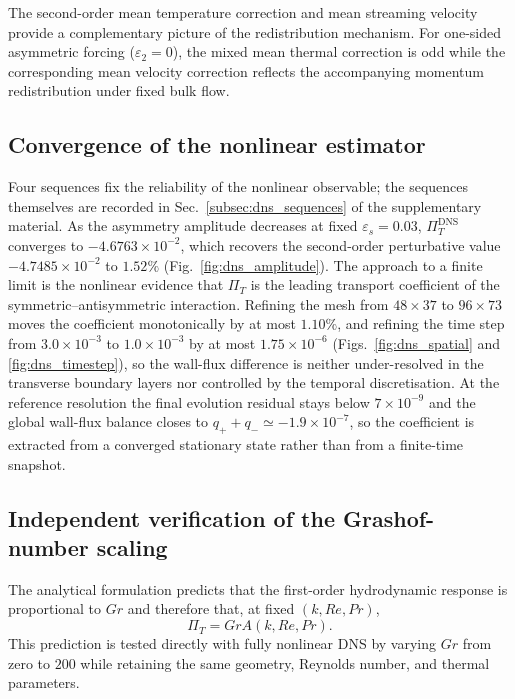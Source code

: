 \documentclass[12pt,a4paper]{article}
\newcommand{\Rey}{\mathit{Re}}
\newcommand{\Grr}{\mathit{Gr}}
\renewcommand{\Pr}{\mathit{Pr}}
\newcommand{\PiT}{\Pi_T}
\begin{document}
The second-order mean temperature correction and mean streaming velocity provide a complementary picture
of the redistribution mechanism. For one-sided asymmetric forcing ($\varepsilon_2=0$), the mixed mean
thermal correction is odd while the corresponding mean velocity correction reflects the accompanying momentum
redistribution under fixed bulk flow.

\subsection{Convergence of the nonlinear estimator}
\label{subsec:dns_amplitude}
\label{subsec:dns_convergence}

Four sequences fix the reliability of the nonlinear observable; the sequences
themselves are recorded in Sec.~\ref{subsec:dns_sequences} of the supplementary material. As the
asymmetry amplitude decreases at fixed $\varepsilon_s=0.03$,
$\PiT^{\mathrm{DNS}}$ converges to $-4.6763\times10^{-2}$, which recovers the
second-order perturbative value $-4.7485\times10^{-2}$ to $1.52\%$
(Fig.~\ref{fig:dns_amplitude}). The approach to a finite limit is the nonlinear evidence that $\PiT$ is the leading transport coefficient of the symmetric--antisymmetric interaction. Refining
the mesh from $48\times37$ to $96\times73$ moves the coefficient monotonically by
at most $1.10\%$, and refining the time step from $3.0\times10^{-3}$ to
$1.0\times10^{-3}$ by at most $1.75\times10^{-6}$
(Figs.~\ref{fig:dns_spatial} and \ref{fig:dns_timestep}), so the wall-flux
difference is neither under-resolved in the transverse boundary layers nor
controlled by the temporal discretisation. At the reference resolution the final
evolution residual stays below $7\times10^{-9}$ and the global wall-flux balance
closes to $q_++q_-\simeq-1.9\times10^{-7}$, so the coefficient is extracted from a
converged stationary state rather than from a finite-time snapshot.

\subsection{Independent verification of the Grashof-number scaling}
\label{subsec:dns_gr}

The analytical formulation predicts that the first-order hydrodynamic response
is proportional to $\Grr$ and therefore that, at fixed $(k,\Rey,\Pr)$,
\begin{equation}
\PiT=\Grr A(k,\Rey,\Pr).
\end{equation}
This prediction is tested directly with fully nonlinear DNS by varying
$\Grr$ from zero to $200$ while retaining the same geometry, Reynolds number,
and thermal parameters.
\end{document}
